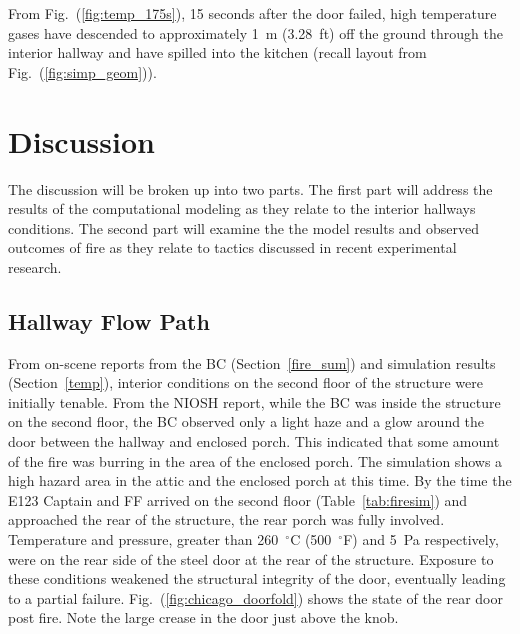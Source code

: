 \documentclass[11pt,oneside]{book}
\begin{document}
From Fig.~(\ref{fig:temp_175s}), 15 seconds after the door failed, high temperature gases have descended to approximately 1~m (3.28~ft) off the ground through the interior hallway and have spilled into the kitchen (recall layout from Fig.~(\ref{fig:simp_geom})).


\chapter{Discussion}
The discussion will be broken up into two parts. The first part will address the results of the computational modeling as they relate to the interior hallways conditions. The second part will examine the the model results and observed outcomes of fire as they relate to tactics discussed in recent experimental research. 

\section{Hallway Flow Path}
From on-scene reports from the BC (Section~\ref{fire_sum}) and simulation results (Section~\ref{temp}), interior conditions on the second floor of the structure were initially tenable. From the NIOSH report, while the BC was inside the structure on the second floor, the  BC observed only a light haze and a glow around the door between the hallway and enclosed porch. This indicated that some amount of the fire was burring in the area of the enclosed porch. The simulation shows a high hazard area in the attic and the enclosed porch at this time. By the time the E123 Captain and FF arrived on the second floor (Table~\ref{tab:firesim}) and approached the rear of the structure, the rear porch was fully involved. Temperature and pressure, greater than 260~$^{\circ}$C (500~$^{\circ}$F) and 5~Pa respectively, were on the rear side of the steel door at the rear of the structure. Exposure to these conditions weakened the structural integrity of the door, eventually leading to a partial failure. Fig.~(\ref{fig:chicago_doorfold}) shows the state of the rear door post fire. Note the large crease in the door just above the knob.
\end{document}
